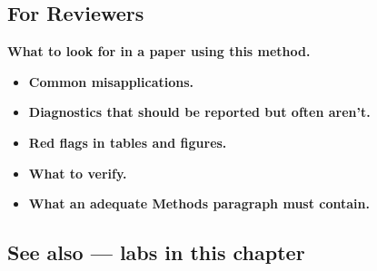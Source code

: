 \documentclass[
]{article}
\providecommand{\tightlist}{%
  \setlength{\itemsep}{0pt}\setlength{\parskip}{0pt}}
\begin{document}
\subsection{For Reviewers}\label{for-reviewers}

\textbf{What to look for in a paper using this method.}

\begin{itemize}
\tightlist
\item
  \textbf{Common misapplications.}
\item
  \textbf{Diagnostics that should be reported but often aren't.}
\item
  \textbf{Red flags in tables and figures.}
\item
  \textbf{What to verify.}
\item
  \textbf{What an adequate Methods paragraph must contain.}
\end{itemize}

\subsection{See also --- labs in this
chapter}\label{see-also-labs-in-this-chapter}
\end{document}
